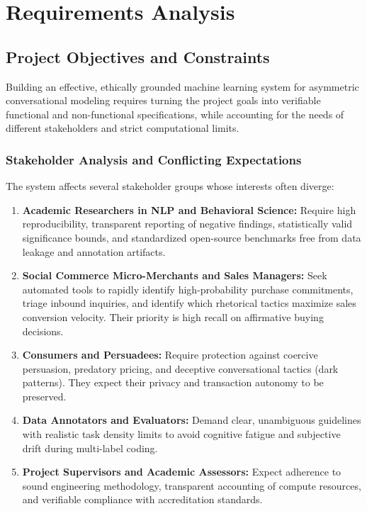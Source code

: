 \chapter{Requirements Analysis}
\label{ch:requirements}

\section{Project Objectives and Constraints}
\label{sec:requirements}

Building an effective, ethically grounded machine learning system for asymmetric conversational modeling requires turning the project goals into verifiable functional and non-functional specifications, while accounting for the needs of different stakeholders and strict computational limits.

\subsection{Stakeholder Analysis and Conflicting Expectations}
The system affects several stakeholder groups whose interests often diverge:
\begin{enumerate}
  \item \textbf{Academic Researchers in NLP and Behavioral Science:} Require high reproducibility, transparent reporting of negative findings, statistically valid significance bounds, and standardized open-source benchmarks free from data leakage and annotation artifacts.
  \item \textbf{Social Commerce Micro-Merchants and Sales Managers:} Seek automated tools to rapidly identify high-probability purchase commitments, triage inbound inquiries, and identify which rhetorical tactics maximize sales conversion velocity. Their priority is high recall on affirmative buying decisions.
  \item \textbf{Consumers and Persuadees:} Require protection against coercive persuasion, predatory pricing, and deceptive conversational tactics (dark patterns). They expect their privacy and transaction autonomy to be preserved.
  \item \textbf{Data Annotators and Evaluators:} Demand clear, unambiguous guidelines with realistic task density limits to avoid cognitive fatigue and subjective drift during multi-label coding.
  \item \textbf{Project Supervisors and Academic Assessors:} Expect adherence to sound engineering methodology, transparent accounting of compute resources, and verifiable compliance with accreditation standards.
\end{enumerate}

